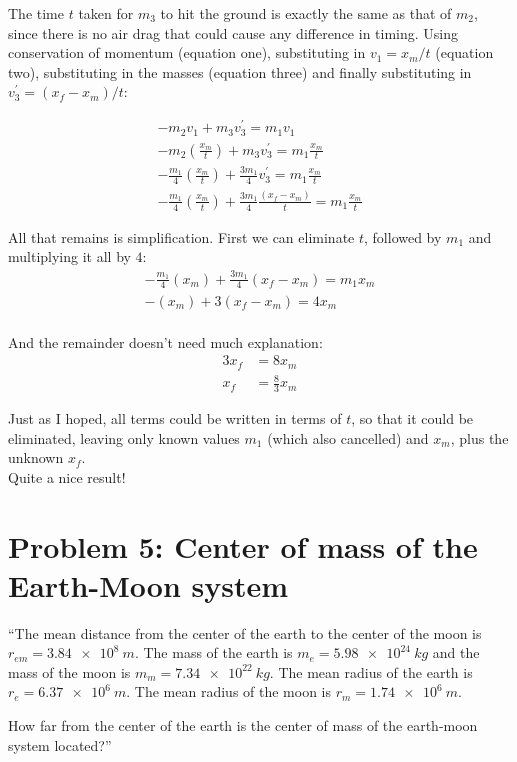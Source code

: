 \documentclass[8.01x]{subfiles}
\begin{document}
The time $t$ taken for $m_3$ to hit the ground is exactly the same as that of $m_2$, since there is no air drag that could cause any difference in timing. Using conservation of momentum (equation one), substituting in $v_1 = x_m/t$ (equation two), substituting in the masses (equation three) and finally substituting in $v_3^{'} = (x_f - x_m)/t$:

\begin{align}
-m_2 v_1 + m_3 v_3^{'} = m_1 v_1\\
-m_2 (\frac{x_m}{t}) + m_3 v_3^{'} = m_1 \frac{x_m}{t}\\
-\frac{m_1}{4} (\frac{x_m}{t}) + \frac{3m_1}{4} v_3^{'} = m_1 \frac{x_m}{t}\\
-\frac{m_1}{4} (\frac{x_m}{t}) + \frac{3m_1}{4} \frac{(x_f - x_m)}{t} = m_1 \frac{x_m}{t}
\end{align}

All that remains is simplification. First we can eliminate $t$, followed by $m_1$ and multiplying it all by $4$:
\begin{align}
-\frac{m_1}{4} (x_m) + \frac{3m_1}{4} (x_f - x_m) = m_1 x_m\\
-(x_m) + 3 (x_f - x_m) = 4 x_m\\
\end{align}

And the remainder doesn't need much explanation:
\begin{align}
3 x_f &= 8 x_m\\
x_f &= \frac{8}{3} x_m
\end{align}

Just as I hoped, all terms could be written in terms of $t$, so that it could be eliminated, leaving only known values $m_1$ (which also cancelled) and $x_m$, plus the unknown $x_f$.\\
Quite a nice result!

\section{Problem 5: Center of mass of the Earth-Moon system}

``The mean distance from the center of the earth to the center of the moon is $r_{em} = \SI{3.84e8}{m}$. The mass of the earth is $m_e = \SI{5.98e24}{kg}$ and the mass of the moon is $m_m = \SI{7.34e22}{kg}$. The mean radius of the earth is $r_e = \SI{6.37e6}{m}$. The mean radius of the moon is $r_m = \SI{1.74e6}{m}$.

How far from the center of the earth is the center of mass of the earth-moon system located?''
\end{document}
